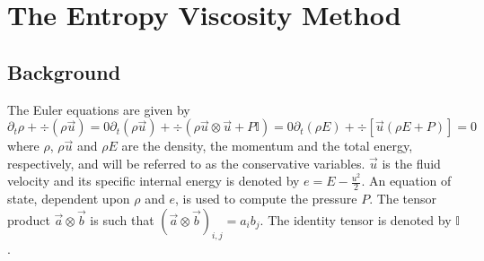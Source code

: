 \section{The Entropy Viscosity Method} \label{sec:entro_visc}

\subsection{Background} \label{sec:background}

The Euler equations are given by
\begin{subequations}
\label{eq:euler_eq}
%
\begin{equation}
\partial_t \rho  + \div \left( \rho \vec{u} \right) = 0
\end{equation}
%
\begin{equation}
\partial_t \left( \rho \vec{u} \right) + \div \left( \rho \vec{u} \otimes \vec{u} + P \mathbb{I} \right) = 0 
\end{equation}
%
\begin{equation}
\partial_t \left( \rho E \right) + \div \left[ \vec{u} \left( \rho E + P \right) \right] = 0
\end{equation}
\end{subequations}
%
where $\rho$, $\rho \vec{u}$ and $\rho E$ are the density, the momentum and the total energy, respectively, and will be referred to as the conservative variables. $\vec{u}$ is the fluid velocity and its specific internal energy is denoted by $e=E-\tfrac{u^2}{2}$. An equation of state, dependent upon $\rho$ and $e$, is used to compute the pressure $P$. The tensor product $\vec{a} \otimes \vec{b}$ is such that $(\vec{a} \otimes \vec{b})_{i,j} = a_i b_j$. The identity tensor is denoted by $\mathbb{I}$.

